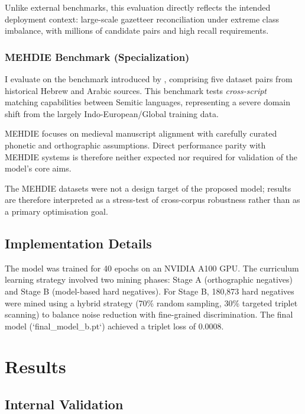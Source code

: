 \documentclass[11pt]{article}
\begin{document}
    Unlike external benchmarks, this evaluation directly reflects the intended deployment context:
    large-scale gazetteer reconciliation under extreme class imbalance, with millions of candidate
    pairs and high recall requirements.

    \subsubsection{MEHDIE Benchmark (Specialization)}
    I evaluate on the benchmark introduced by \citet{mehdie2025}, comprising five dataset pairs from historical Hebrew and Arabic sources. This benchmark tests \emph{cross-script} matching capabilities between Semitic languages, representing a severe domain shift from the largely Indo-European/Global training data.

    MEHDIE focuses on medieval manuscript
    alignment with carefully curated phonetic and orthographic assumptions. Direct performance parity
    with MEHDIE systems is therefore neither expected nor required for validation of the model’s core aims.

    The MEHDIE datasets were not a design target of the proposed model; results are therefore
    interpreted as a stress-test of cross-corpus robustness rather than as a primary optimisation goal.

    \subsection{Implementation Details}
    The model was trained for 40 epochs on an NVIDIA A100 GPU. The curriculum learning strategy involved two mining phases: Stage A (orthographic negatives) and Stage B (model-based hard negatives). For Stage B, 180,873 hard negatives were mined using a hybrid strategy (70\% random sampling, 30\% targeted triplet scanning) to balance noise reduction with fine-grained discrimination. The final model (`final\_model\_b.pt`) achieved a triplet loss of $0.0008$.



    \section{Results}
    \label{sec:results}

    \subsection{Internal Validation}
\end{document}

